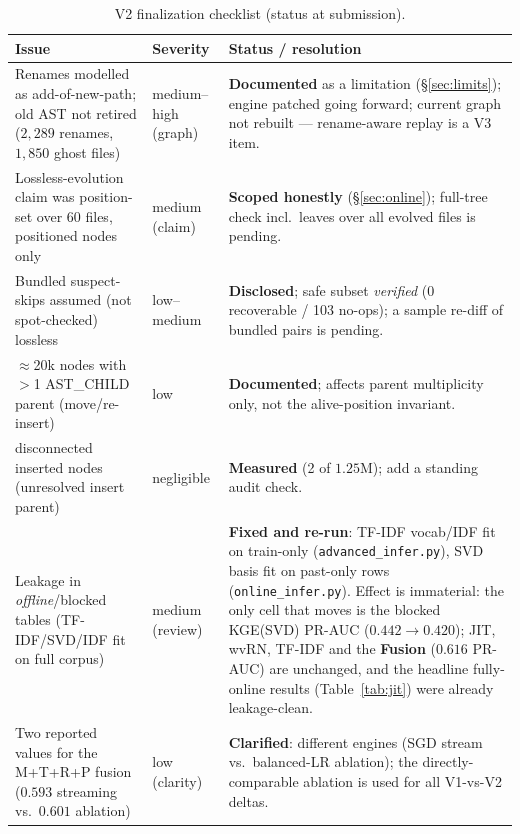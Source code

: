 \documentclass[11pt,a4paper]{article}
\newcommand{\edge}[1]{\textsc{#1}}
\begin{document}
	\begin{table}[H]\centering\small
	\caption{V2 finalization checklist (status at submission).}\label{tab:v2finalize}
	\begin{tabular}{@{}p{6.4cm}p{2.2cm}p{6.0cm}@{}}
	\toprule
	\textbf{Issue} & \textbf{Severity} & \textbf{Status / resolution}\\
	\midrule
	Renames modelled as add-of-new-path; old AST not retired
	($2{,}289$ renames, $1{,}850$ ghost files) & medium--high (graph) &
	\textbf{Documented} as a limitation (\S\ref{sec:limits}); engine patched going
	forward; current graph not rebuilt --- rename-aware replay is a V3 item.\\
	\addlinespace
	Lossless-evolution claim was position-set over 60 files, positioned nodes only &
	medium (claim) & \textbf{Scoped honestly} (\S\ref{sec:online}); full-tree check
	incl.\ leaves over all evolved files is pending.\\
	\addlinespace
	Bundled suspect-skips assumed (not spot-checked) lossless & low--medium &
	\textbf{Disclosed}; safe subset \emph{verified} (0 recoverable / 103 no-ops); a
	sample re-diff of bundled pairs is pending.\\
	\addlinespace
	$\approx$20k nodes with $>$1 \edge{AST\_CHILD} parent (move/re-insert) & low &
	\textbf{Documented}; affects parent multiplicity only, not the alive-position
	invariant.\\
	\addlinespace
	2 disconnected inserted nodes (unresolved insert parent) & negligible &
	\textbf{Measured} (2 of $1.25$M); add a standing audit check.\\
	\addlinespace
	Leakage in \emph{offline}/blocked tables (TF-IDF/SVD/IDF fit on full corpus) &
	medium (review) & \textbf{Fixed and re-run}: TF-IDF vocab/IDF fit on train-only
	(\texttt{advanced\_infer.py}), SVD basis fit on past-only rows
	(\texttt{online\_infer.py}). Effect is immaterial: the only cell that moves is
	the blocked KGE(SVD) PR-AUC ($0.442\!\rightarrow\!0.420$); JIT, wvRN, TF-IDF and
	the \textbf{Fusion} ($0.616$ PR-AUC) are unchanged, and the headline fully-online
	results (Table~\ref{tab:jit}) were already leakage-clean.\\
	\addlinespace
	Two reported values for the M+T+R+P fusion ($0.593$ streaming vs.\ $0.601$
	ablation) & low (clarity) & \textbf{Clarified}: different engines (SGD stream
	vs.\ balanced-LR ablation); the directly-comparable ablation is used for all
	V1-vs-V2 deltas.\\
	\bottomrule
	\end{tabular}
	\end{table}
\end{document}

